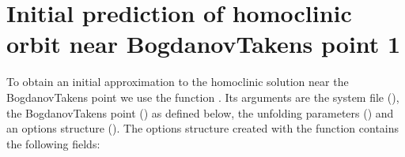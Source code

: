 \documentclass[letterpaper,10pt,english]{jupyterBook}
\begin{document}
\noindent{}


\section{Initial prediction of homoclinic orbit near Bogdanov\sphinxhyphen{}Takens point 1}
\label{\detokenize{HomoclinicRGflows:initial-prediction-of-homoclinic-orbit-near-bogdanov-takens-point-1}}
\sphinxAtStartPar
To obtain an initial approximation to the homoclinic solution near the
Bogdanov\sphinxhyphen{}Takens point we use the function . Its arguments are the
system file (), the Bogdanov\sphinxhyphen{}Takens point () as defined below, the
unfolding parameters () and an options structure (). The options
structure created with the function  contains the following
fields:
\end{document}
